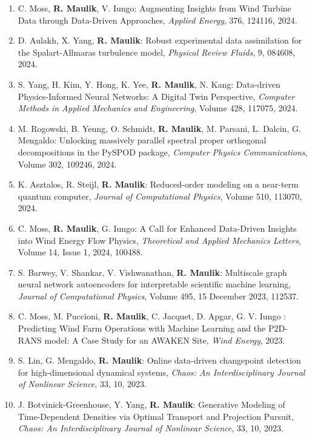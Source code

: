 \documentclass[letterpaper]{article}
\begin{document}
\begin{enumerate}
\item C. Moss, \textbf{R. Maulik}, V. Iungo: Augmenting Insights from Wind Turbine Data through Data-Driven Approaches, {\it Applied Energy}, 376, 124116, 2024.

\item D. Aulakh, X. Yang, \textbf{R. Maulik}: Robust experimental data assimilation for the Spalart-Allmaras turbulence model, {\it Physical Review Fluids}, 9, 084608, 2024.

\item S. Yang, H. Kim, Y. Hong, K. Yee, \textbf{R. Maulik}, N. Kang:  Data-driven Physics-Informed Neural Networks: A Digital Twin Perspective, {\it Computer Methods in Applied Mechanics and Engineering}, Volume 428, 117075, 2024.

\item M. Rogowski, B. Yeung, O. Schmidt, \textbf{R. Maulik}, M. Parsani, L. Dalcin, G. Mengaldo: Unlocking massively parallel spectral proper orthogonal decompositions in the PySPOD package, {\it Computer Physics Communications}, Volume 302, 109246, 2024.

\item K. Asztalos, R. Steijl, \textbf{R. Maulik}: Reduced-order modeling on a near-term quantum computer, {\it Journal of Computational Physics}, Volume 510, 113070, 2024.

\item C. Moss, \textbf{R. Maulik}, G. Iungo: A Call for Enhanced Data-Driven Insights into Wind Energy Flow Physics, {\it Theoretical and Applied Mechanics Letters}, Volume 14, Issue 1, 2024, 100488.

\item S. Barwey, V. Shankar, V. Vishwanathan, \textbf{R. Maulik}: Multiscale graph neural network autoencoders for interpretable scientific machine learning, {\it Journal of Computational Physics}, Volume 495, 15 December 2023, 112537.

\item C. Moss, M. Puccioni, \textbf{R. Maulik}, C. Jacquet, D. Apgar, G. V. Iungo : Predicting Wind Farm Operations with Machine Learning and the P2D-RANS model: A Case Study for an AWAKEN Site, {\it Wind Energy}, 2023.

\item S. Lin, G. Mengaldo, \textbf{R. Maulik}: Online data-driven changepoint detection for high-dimensional dynamical systems, {\it Chaos: An Interdisciplinary Journal of Nonlinear Science}, 33, 10, 2023.

\item J. Botvinick-Greenhouse, Y. Yang, \textbf{R. Maulik}: Generative Modeling of Time-Dependent Densities via Optimal Transport and Projection Pursuit, {\it Chaos: An Interdisciplinary Journal of Nonlinear Science}, 33, 10, 2023.


\end{enumerate}
\end{document}
